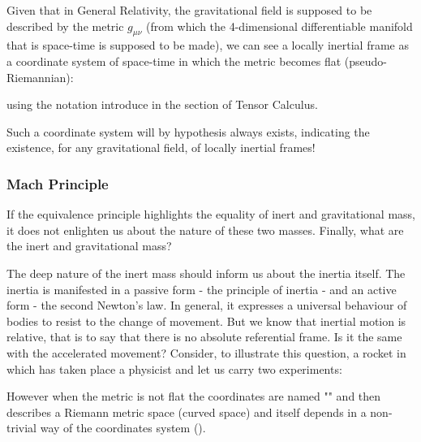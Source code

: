 	Given that in General Relativity, the gravitational field is supposed to be described by the metric $g_{\mu\nu}$ (from which the 4-dimensional differentiable manifold that is space-time is supposed to be made), we can see a locally inertial frame as a coordinate system of space-time in which the metric becomes flat (pseudo-Riemannian):
	
	using the notation introduce in the section of Tensor Calculus.
	
	Such a coordinate system will by hypothesis always exists, indicating the existence, for any gravitational field, of locally inertial frames!
	
	\subsubsection{Mach Principle}
	
	If the equivalence principle highlights the equality of inert and gravitational mass, it does not enlighten us about the nature of these two masses. Finally, what are the inert and gravitational mass?
	
	The deep nature of the inert mass should inform us about the inertia itself. The inertia is manifested in a passive form - the principle of inertia - and an active form - the second Newton's law. In general, it expresses a universal behaviour of bodies to resist to the change of movement. But we know that inertial motion is relative, that is to say that there is no absolute referential frame. Is it the same with the accelerated movement? Consider, to illustrate this question, a rocket in which has taken place a physicist and let us carry two experiments:
	
	
	However when the metric is not flat the coordinates are named "" and then describes a Riemann metric space (curved space) and itself depends in a non-trivial way of the coordinates system ().
	
